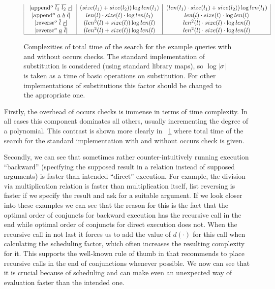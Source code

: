 \begin{figure}[t]
\[\begin{tabular}{|c|c|c|}
           \lstinline|append$^o$ $\overline{l_1}$ $\overline{l_2}$ $\underline{r}$| & $(size(l_1) + size(l_2)) \log len(l_1)$ & $(len(l_1) \cdot size(l_1) + size(l_2)) \log len(l_1)$  \\
           \lstinline|append$^o$ $\underline{a}$ $\underline{b}$ $\overline{l}$| & $len(l) \cdot size(l) \cdot  \log len(l_1)$ & $len(l) \cdot size(l) \cdot  \log len(l)$  \\
           \lstinline|reverse$^o$ $\overline{l}$ $\underline{r}$| & $(len^3(l) + size(l)) \log len(l)$ & $len^2(l) \cdot size(l) \cdot \log len(l)$ \\
           \lstinline|reverse$^o$ $\underline{a}$ $\overline{l}$| & $(len^2(l) + size(l)) \log len(l)$ & $len^2(l) \cdot size(l) \cdot \log len(l)$ \\
           \hline
            
      \end{tabular}
    \]
  \caption{Complexities of total time of the search for the example queries with and without occurs checks. The standard implementation of substitution is considered (using standard library maps), so $\log |\sigma|$ is taken as a time of basic operations on substitution. For other implementations of substitutions this factor should be changed to the appropriate one. }
  \label{fig:examples_total_times}
\end{figure}

Firstly, the overhead of occurs checks is immense in terms of time complexity. In all cases this component dominates all others, usually incrementing the degree of a polynomial. This contrast is shown more clearly in \figureword~\ref{fig:examples_total_times} where total time of the search for the standard implementation with and without occurs check is given. 

Secondly, we can see that sometimes rather counter-intuitively running execution ``backward'' (specifying the supposed result in a relation instead of supposed arguments) is faster than intended ``direct'' execution. For example, the division via multiplication relation is faster than multiplication itself, list reversing is faster if we specify the result and ask for a suitable argument. If we look closer into these examples we can see that the reason for this is the fact that the optimal order of conjuncts for backward execution has the recursive call in the end while optimal order of conjuncts for direct execution does not. When the recursive call in not last it forces us to add the value of $d(\cdot)$ for this call when calculating the scheduling factor, which often increases the resulting complexity for it. This supports the well-known rule of thumb in \mK that recommends to place recursive calls in the end of conjunctions whenever possible. We now can see that it is crucial because of scheduling and can make even an unexpected way of evaluation faster than the intended one.


